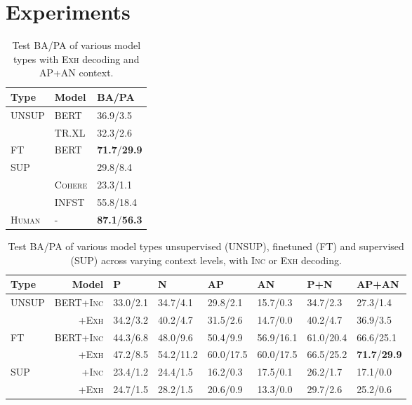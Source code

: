 \documentclass[11pt,a4paper]{article}
\begin{document}
\section{Experiments}
\label{sec:experiments}
\begin{table}
\centering
\begin{tabular}{l l l}
\toprule
\bf Type & \bf Model & \bf{BA/PA}   \\ 
\midrule
\multirow{2}{*}{\textsc{UNSUP}} 
& \textsc{BERT} & 36.9/3.5   \\
  &\textsc{TR.XL} & 32.3/2.6 \\
 \midrule
\multirow{1}{*}{\textsc{FT}} & \textsc{BERT} &  \textbf{71.7}/\textbf{29.9}\\
 \midrule
  \multirow{3}{*}{\textsc{SUP}}
& \textsc{}  & 29.8/8.4    \\
& \textsc{\textsc{Cohere}} & 23.3/1.1    \\
& \textsc{INFST} & 55.8/18.4\\
\midrule
\multirow{1}{*}{\textsc{Human}}  
& -& \textbf{87.1}/\textbf{56.3}    \\
\bottomrule
\end{tabular}
\caption{Test \textsc{BA}/\textsc{PA} of various model types with \textsc{Exh} decoding and AP+AN context.}
\label{tab:apnres}
\end{table}

\begin{table*}
\centering
\begin{tabular}{l r l l l l l l}
\toprule
\bf Type & \bf Model &  \textsc{P}  &  \textsc{N} & \textsc{AP}  & \textsc{AN} & \textsc{P+N}   & \textsc{AP+AN}   \\ 
\midrule
\multirow{2}{*}{\textsc{UNSUP}} 
& \textsc{BERT+\textsc{Inc}} & 33.0/2.1 & 34.7/4.1 & 29.8/2.1  & 15.7/0.3  & 34.7/2.3 & 27.3/1.4  \\
& \textsc{+\textsc{Exh}} & 34.2/3.2 & 40.2/4.7 & 31.5/2.6  & 14.7/0.0 & 40.2/4.7 & 36.9/3.5   \\
\midrule
\multirow{2}{*}{\textsc{FT}} & \textsc{BERT+\textsc{Inc}} & 44.3/6.8 & 48.0/9.6 & 50.4/9.9 & 56.9/16.1 & 61.0/20.4 & 66.6/25.1 \\
& \textsc{+\textsc{Exh}} & 47.2/8.5 & 54.2/11.2 & 60.0/17.5 & 60.0/17.5 & 66.5/25.2 & \textbf{71.7}/\textbf{29.9}\\
 \midrule
  \multirow{2}{*}{\textsc{SUP}}
& \textsc{+\textsc{Inc}} & 23.4/1.2  & 24.4/1.5 & 16.2/0.3 &  17.5/0.1 & 26.2/1.7 & 17.1/0.0   \\
& \textsc{+\textsc{Exh}} & 24.7/1.5  & 28.2/1.5 & 20.6/0.9 &  13.3/0.0 & 29.7/2.6 & 25.2/0.6  \\
\bottomrule
\end{tabular}
\caption{Test \textsc{BA}/\textsc{PA} of various model types unsupervised (\textsc{UNSUP}), finetuned (\textsc{FT}) and supervised (\textsc{SUP}) across varying context levels, with \textsc{Inc} or \textsc{Exh} decoding.}
\label{tab:mainres}
\end{table*}
\end{document}

